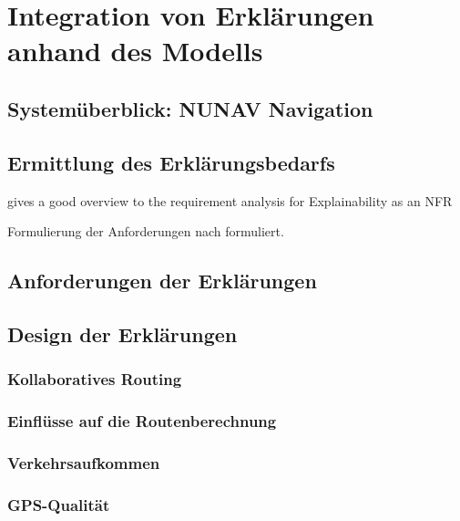 \section{Integration von Erklärungen anhand des Modells}

\subsection{Systemüberblick: NUNAV Navigation}

\subsection{Ermittlung des Erklärungsbedarfs}

\cite{golledge1999wayfinding}

\cite{bovy2012route}

\cite{kohl_explainability_2019} gives a good overview to the requirement analysis for Explainability as an NFR

Formulierung der Anforderungen nach \cite{rajnish2010quality, wiegers1999writing, alexander2002writing} formuliert.

\subsection{Anforderungen der Erklärungen}

\subsection{Design der Erklärungen}

\subsubsection{Kollaboratives Routing}
\label{sec:user_count_definition}

\subsubsection{Einflüsse auf die Routenberechnung}
\label{sec:route_explanation_definition}

\subsubsection{Verkehrsaufkommen}
\label{sec:traffic_volume_definition}

\subsubsection{GPS-Qualität}
\label{sec:gps_accuracy_definition}

